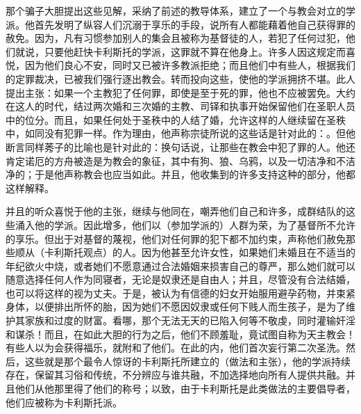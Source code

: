 那个骗子大胆提出这些见解，采纳了前述的教导体系，建立了一个与教会对立的学派。他首先发明了纵容人们沉溺于享乐的手段，说所有人都能藉着他自己获得罪的赦免。因为，凡有习惯参加别人的集会且被称为基督徒的人，若犯了任何过犯，他们就说，只要他赶快卡利斯托的学派，这罪就不算在他身上。许多人因这规定而喜悦，因为他们良心不安，同时又已被许多教派拒绝；而且他们中有些人，根据我们的定罪裁决，已被我们强行逐出教会。转而投向这些，使他的学派拥挤不堪。此人提出主张：如果一个主教犯了任何罪，即使是至于死的罪，他也不应被罢免。大约在这人的时代，结过两次婚和三次婚的主教、司铎和执事开始保留他们在圣职人员中的位分。而且，如果任何处于圣秩中的人结了婚，允许这样的人继续留在圣秩中，如同没有犯罪一样。作为理由，他声称宗徒所说的这些话是针对此的：。但他断言同样莠子的比喻也是针对此的：换句话说，让那些在教会中犯了罪的人。他还肯定诺厄的方舟被造是为教会的象征，其中有狗、狼、乌鸦，以及一切洁净和不洁净的；于是他声称教会也应当如此。并且，他收集到的许多支持这种的部分，他都这样解释。\par

并且的听众喜悦于他的主张，继续与他同在，嘲弄他们自己和许多，成群结队的这些涌入他的学派。因此增多，他们以（参加学派的）人群为荣，为了基督所不允许的享乐。但出于对基督的蔑视，他们对任何罪的犯下都不加约束，声称他们赦免那些顺从（卡利斯托观点）的人。因为他甚至允许女性，如果她们未婚且在不适当的年纪欲火中烧，或者她们不愿意通过合法婚姻来损害自己的尊严，那么她们就可以随意选择任何人作为同寝者，无论是奴隶还是自由人；并且，尽管没有合法结婚，也可以将这样的视为丈夫。于是，被认为有信德的妇女开始服用避孕药物，并束紧身体，以便排出所怀的胎，因为她们不愿因奴隶或任何下贱人而生孩子，是为了维护其家族和过度的财富。看哪，那个无法无天的已陷入何等不敬虔，同时灌输奸淫和谋杀！而且，在如此大胆的行为之后，他们不顾羞耻，竟试图自称为天主教会！有些人以为会获得福乐，就附和了他们。在此的内，他们首次妄行第二次圣洗。然后，这些就是那个最令人惊讶的卡利斯托所建立的（做法和主张），他的学派持续存在，保留其习俗和传统，不分辨应与谁共融，不加选择地向所有人提供共融。并且他们从他那里得了他们的称号；以致，由于卡利斯托是此类做法的主要倡导者，他们应被称为卡利斯托派。\par

